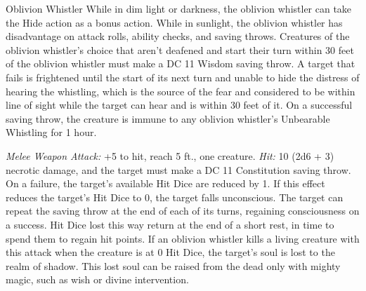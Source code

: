 \documentclass[10pt,a4paper,twoside,twocolumn,openany,bg=print,nodeprecatedcode]{dndbook}
\begin{document}
\begin{DndMonster}[float*=t]{Oblivion Whistler}
\DndMonsterBasics[
armor-class = {13},
hit-points = {\DndDice{6d8 + 6}},
speed = {40 ft.}
]
\DndMonsterAbilityScores[
 str = 12,
 dex = 16,
 con = 13,
 int = 10,
 wis = 10,
 cha = 8
]
\DndMonsterDetails[
skills = {Stealth +5},
damage-vulnerabilities = {radiant},
damage-resistances = {cold; bludgeoning, piercing, slashing from nonmagical attacks},
damage-immunities = {necrotic, poison},
senses = {darkvision 60 ft., passive perception 10},
challenge = 2,
]
While in dim light or darkness, the oblivion whistler can take the Hide action as a bonus action.
While in sunlight, the oblivion whistler has disadvantage on attack rolls, ability checks, and saving throws.
Creatures of the oblivion whistler's choice that aren't deafened and start their turn within 30 feet of the oblivion whistler must make a DC 11 Wisdom saving throw. A target that fails is frightened until the start of its next turn and unable to hide the distress of hearing the whistling, which is the source of the fear and considered to be within line of sight while the target can hear and is within 30 feet of it. On a successful saving throw, the creature is immune to any oblivion whistler's Unbearable Whistling for 1 hour.
\par
{}
\textsl{Melee Weapon Attack:} +5 to hit, reach 5 ft., one creature. \textsl{Hit:} 10 (2d6 + 3) necrotic damage, and the target must make a DC 11 Constitution saving throw. On a failure, the target's available Hit Dice are reduced by 1. If this effect reduces the target's Hit Dice to 0, the target falls unconscious. The target can repeat the saving throw at the end of each of its turns, regaining consciousness on a success. Hit Dice lost this way return at the end of a short rest, in time to spend them to regain hit points.
If an oblivion whistler kills a living creature with this attack when the creature is at 0 Hit Dice, the target's soul is lost to the realm of shadow. This lost soul can be raised from the dead only with mighty magic, such as wish or divine intervention.
\end{DndMonster}
\end{document}
